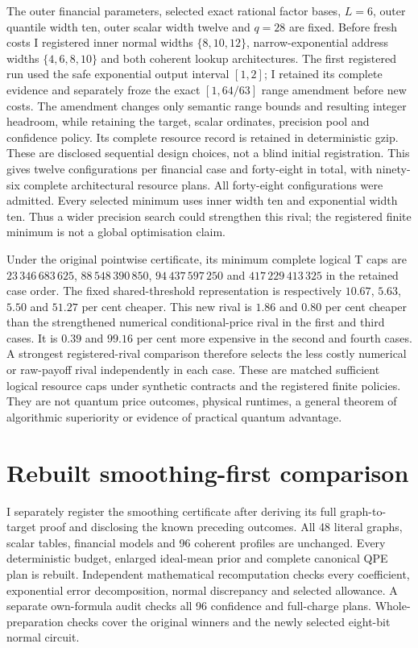 \documentclass[11pt]{article}
\begin{document}
The outer financial parameters, selected exact rational factor bases,
$L=6$, outer quantile width ten, outer scalar width twelve and $q=28$
are fixed. Before fresh costs I registered inner normal widths
$\{8,10,12\}$, narrow-exponential address widths $\{4,6,8,10\}$
and both coherent lookup architectures. The first registered run used the
safe exponential output interval $[1,2]$; I retained its complete evidence
and separately froze the exact $[1,64/63]$ range amendment before new costs.
The amendment changes only semantic range bounds and resulting integer
headroom, while retaining the target, scalar ordinates, precision pool and
confidence policy. Its complete resource record is retained in deterministic
gzip. These are disclosed sequential design choices, not a blind initial
registration. This gives twelve configurations
per financial case and forty-eight in total, with ninety-six complete
architectural resource plans. All forty-eight configurations were admitted.
Every selected minimum uses inner width ten and exponential width ten.
Thus a wider precision search could strengthen this rival; the registered
finite minimum is not a global optimisation claim.

Under the original pointwise certificate, its minimum complete logical T caps are
$23\,346\,683\,625$, $88\,548\,390\,850$,
$94\,437\,597\,250$ and $417\,229\,413\,325$ in the retained
case order. The fixed shared-threshold representation is respectively
$10.67$, $5.63$, $5.50$ and $51.27$ per cent cheaper. This new rival
is $1.86$ and $0.80$ per cent cheaper than the strengthened numerical
conditional-price rival in the first and third cases. It is $0.39$ and
$99.16$ per cent more expensive in the second and fourth cases. A strongest
registered-rival comparison therefore selects the less costly numerical or
raw-payoff rival independently in each case.
These are matched sufficient logical resource caps under synthetic
contracts and the registered finite policies. They are not quantum
price outcomes, physical runtimes, a general theorem of algorithmic
superiority or evidence of practical quantum advantage.
\section{Rebuilt smoothing-first comparison}

I separately register the smoothing certificate after deriving its full
graph-to-target proof and disclosing the known preceding outcomes. All
48 literal graphs, scalar tables, financial models and 96 coherent
profiles are unchanged. Every deterministic budget, enlarged ideal-mean
prior and complete canonical QPE plan is rebuilt. Independent mathematical
recomputation checks every coefficient, exponential error decomposition,
normal discrepancy and selected allowance. A separate own-formula audit
checks all 96 confidence and full-charge plans. Whole-preparation checks
cover the original winners and the newly selected eight-bit normal circuit.
\end{document}
